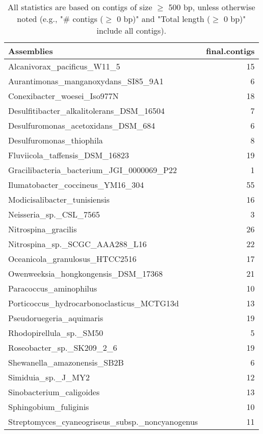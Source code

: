 \documentclass[12pt,a4paper]{article}
\begin{document}
\begin{table}[ht]
\begin{center}
\caption{All statistics are based on contigs of size $\geq$ 500 bp, unless otherwise noted (e.g., "\# contigs ($\geq$ 0 bp)" and "Total length ($\geq$ 0 bp)" include all contigs).}
\begin{tabular}{|l*{1}{|r}|}
\hline
Assemblies & final.contigs \\ \hline
Alcanivorax\_pacificus\_W11\_5 & 15 \\ \hline
Aurantimonas\_manganoxydans\_SI85\_9A1 & 6 \\ \hline
Conexibacter\_woesei\_Iso977N & 18 \\ \hline
Desulfitibacter\_alkalitolerans\_DSM\_16504 & 7 \\ \hline
Desulfuromonas\_acetoxidans\_DSM\_684 & 6 \\ \hline
Desulfuromonas\_thiophila & 8 \\ \hline
Fluviicola\_taffensis\_DSM\_16823 & 19 \\ \hline
Gracilibacteria\_bacterium\_JGI\_0000069\_P22 & 1 \\ \hline
Ilumatobacter\_coccineus\_YM16\_304 & 55 \\ \hline
Modicisalibacter\_tunisiensis & 16 \\ \hline
Neisseria\_sp.\_CSL\_7565 & 3 \\ \hline
Nitrospina\_gracilis & 26 \\ \hline
Nitrospina\_sp.\_SCGC\_AAA288\_L16 & 22 \\ \hline
Oceanicola\_granulosus\_HTCC2516 & 17 \\ \hline
Owenweeksia\_hongkongensis\_DSM\_17368 & 21 \\ \hline
Paracoccus\_aminophilus & 10 \\ \hline
Porticoccus\_hydrocarbonoclasticus\_MCTG13d & 13 \\ \hline
Pseudoruegeria\_aquimaris & 19 \\ \hline
Rhodopirellula\_sp.\_SM50 & 5 \\ \hline
Roseobacter\_sp.\_SK209\_2\_6 & 19 \\ \hline
Shewanella\_amazonensis\_SB2B & 6 \\ \hline
Simiduia\_sp.\_J\_MY2 & 12 \\ \hline
Sinobacterium\_caligoides & 13 \\ \hline
Sphingobium\_fuliginis & 10 \\ \hline
Streptomyces\_cyaneogriseus\_subsp.\_noncyanogenus & 11 \\ \hline

\end{tabular}
\end{center}
\end{table}
\end{document}
